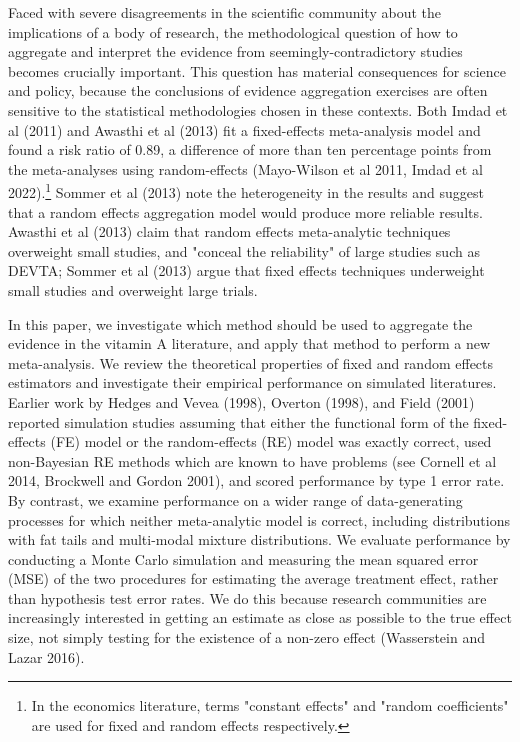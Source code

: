 \documentclass[12pt]{article}
\begin{document}
Faced with severe disagreements in the scientific community about the implications of a body of research, the methodological question of how to aggregate and interpret the evidence from seemingly-contradictory studies becomes crucially important. This question has material consequences for science and policy, because the conclusions of evidence aggregation exercises are often sensitive to the statistical methodologies chosen in these contexts. Both Imdad et al (2011) and Awasthi et al (2013) fit a fixed-effects meta-analysis model and found a risk ratio of 0.89, a difference of more than ten percentage points from the meta-analyses using random-effects (Mayo-Wilson et al 2011, Imdad et al 2022).\footnote{In the economics literature, terms "constant effects" and "random coefficients" are used for fixed and random effects respectively.} Sommer et al (2013) note the heterogeneity in the results and suggest that a random effects aggregation model would produce more reliable results. Awasthi et al (2013) claim that random effects meta-analytic techniques overweight small studies, and "conceal the reliability" of large studies such as DEVTA; Sommer et al (2013) argue that fixed effects techniques underweight small studies and overweight large trials. 

In this paper, we investigate which method should be used to aggregate the evidence in the vitamin A literature, and apply that method to perform a new meta-analysis. We review the theoretical properties of fixed and random effects estimators and investigate their empirical performance on simulated literatures. 
Earlier work by Hedges and Vevea (1998), Overton (1998), and Field (2001) reported simulation studies assuming that either the functional form of the fixed-effects (FE) model or the random-effects (RE) model was exactly correct, used non-Bayesian RE methods which are known to have problems (see Cornell et al 2014, Brockwell and Gordon 2001), and scored performance by type 1 error rate. By contrast, we examine performance on a wider range of data-generating processes for which neither meta-analytic model is correct, including distributions with fat tails and multi-modal mixture distributions. We evaluate performance by conducting a Monte Carlo simulation and measuring the mean squared error (MSE) of the two procedures for estimating the average treatment effect, rather than hypothesis test error rates. We do this because research communities are increasingly interested in getting an estimate as close as possible to the true effect size, not simply testing for the existence of a non-zero effect (Wasserstein and Lazar 2016).
\end{document}
